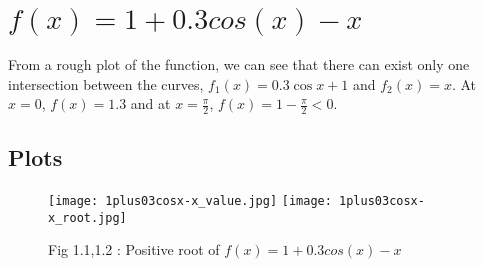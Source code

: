 \documentclass{article}
\begin{document}
\newpage
\section{$f(x) = 1 +0.3cos(x) - x$}

From a rough plot of the function, we can see that there can exist only one intersection between the curves, $f_1(x) = 0.3\cos{x} + 1$ and $f_2(x) = x$. At $x = 0$, $f(x) = 1.3$ and at $x = \frac{\pi}{2}$, $f(x) = 1-\frac{\pi}{2} < 0$.
\subsection{Plots}
\begin{figure}[!h]
    \centering
    \texttt{[image: 1plus03cosx-x\_value.jpg]}
    \texttt{[image: 1plus03cosx-x\_root.jpg]}
    \caption{Fig 1.1,1.2 : Positive root of $f(x) = 1 +0.3cos(x) - x$}
    \label{fig:ques3}
\end{figure}
\end{document}
